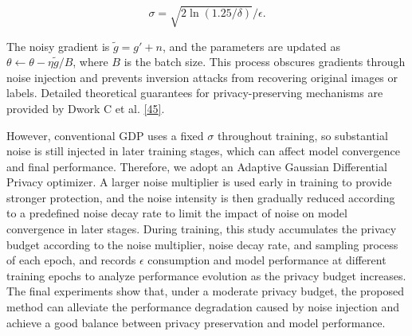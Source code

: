 \begin{equation}\label{eq:noise-multiplier}
\sigma = \sqrt{2\ln(1.25/\delta)}/\epsilon.
\end{equation}

The noisy gradient is \(\widetilde{g} = g' + n\), and the parameters are updated as \(\theta \leftarrow \theta - \eta\widetilde{g}/B\), where \(B\) is the batch size. This process obscures gradients through noise injection and prevents inversion attacks from recovering original images or labels. Detailed theoretical guarantees for privacy-preserving mechanisms are provided by Dwork C et al. \hyperref[_Ref214903493]{{[}45{]}}.

However, conventional GDP uses a fixed \(\sigma\) throughout training, so substantial noise is still injected in later training stages, which can affect model convergence and final performance. Therefore, we adopt an Adaptive Gaussian Differential Privacy optimizer. A larger noise multiplier is used early in training to provide stronger protection, and the noise intensity is then gradually reduced according to a predefined noise decay rate to limit the impact of noise on model convergence in later stages. During training, this study accumulates the privacy budget according to the noise multiplier, noise decay rate, and sampling process of each epoch, and records \(\epsilon\) consumption and model performance at different training epochs to analyze performance evolution as the privacy budget increases. The final experiments show that, under a moderate privacy budget, the proposed method can alleviate the performance degradation caused by noise injection and achieve a good balance between privacy preservation and model performance.
